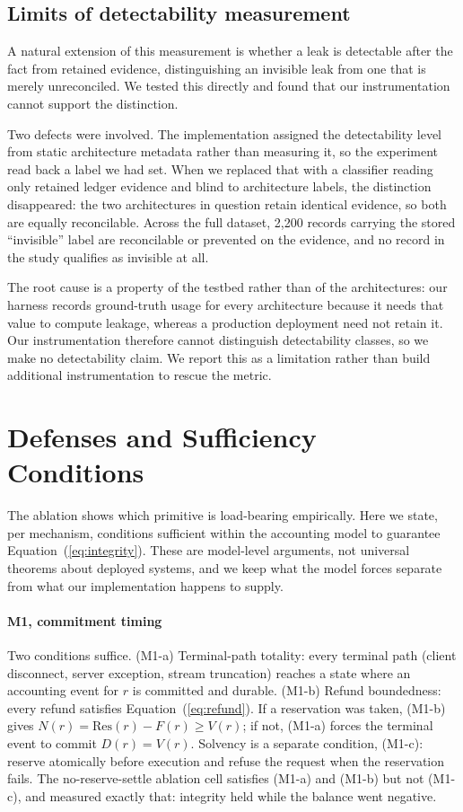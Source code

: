 \documentclass[manuscript,review,anonymous]{acmart}
\begin{document}
\subsection{Limits of detectability measurement}
\label{sec:detect}
A natural extension of this measurement is whether a leak is detectable after the fact
from retained evidence, distinguishing an invisible leak from one that is merely
unreconciled. We tested this directly and found that our instrumentation cannot support
the distinction.

Two defects were involved. The implementation assigned the detectability level from
static architecture metadata rather than measuring it, so the experiment read back a
label we had set. When we replaced that with a classifier reading only retained ledger
evidence and blind to architecture labels, the distinction disappeared: the two
architectures in question retain identical evidence, so both are equally reconcilable.
Across the full dataset, 2{,}200 records carrying the stored ``invisible'' label are
reconcilable or prevented on the evidence, and no record in the study qualifies as
invisible at all.

The root cause is a property of the testbed rather than of the architectures: our
harness records ground-truth usage for every architecture because it needs that value to
compute leakage, whereas a production deployment need not retain it. Our instrumentation
therefore cannot distinguish detectability classes, so we make no detectability claim. We
report this as a limitation rather than build additional instrumentation to rescue the
metric.

\section{Defenses and Sufficiency Conditions}
\label{sec:sufficiency}
The ablation shows which primitive is load-bearing empirically. Here we state, per
mechanism, conditions sufficient within the accounting model to guarantee
Equation~(\ref{eq:integrity}). These are model-level arguments, not universal theorems
about deployed systems, and we keep what the model forces separate from what our
implementation happens to supply.

\paragraph{M1, commitment timing}
Two conditions suffice. (M1-a) Terminal-path totality: every terminal path (client
disconnect, server exception, stream truncation) reaches a state where an accounting
event for $r$ is committed and durable. (M1-b) Refund boundedness: every refund satisfies
Equation~(\ref{eq:refund}). If a reservation was taken, (M1-b) gives $N(r) =
\mathrm{Res}(r) - F(r) \ge V(r)$; if not, (M1-a) forces the terminal event to commit
$D(r) = V(r)$. Solvency is a separate condition, (M1-c): reserve atomically before
execution and refuse the request when the reservation fails. The no-reserve-settle
ablation cell satisfies (M1-a) and (M1-b) but not (M1-c), and measured exactly that:
integrity held while the balance went negative.
\end{document}
